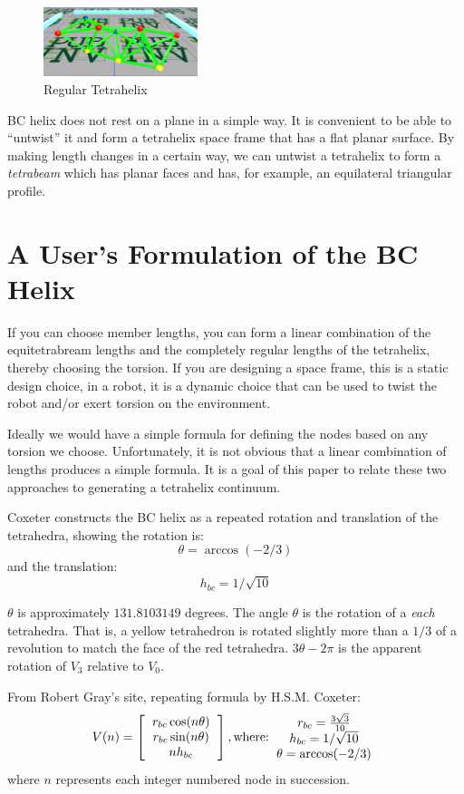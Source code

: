 \documentclass[11pt]{article}
\begin{document}
\begin{figure}[H] %
  \centering
     \includegraphics[width=0.4\textwidth]{figures/Tetrahelix0.png}
     \caption{Regular Tetrahelix}
\end{figure}

BC helix does not rest on a plane in a simple way. It is convenient to be able to ``untwist'' it and form a tetrahelix space frame that
has a flat planar surface. By making length changes in a certain way, we can untwist a tetrahelix to form a \emph{tetrabeam} which
has planar faces and has, for example, an equilateral triangular profile.

\section{A User's Formulation of the BC Helix}

If you can choose member lengths, you can form a linear combination of the equitetrabream lengths and the completely regular
lengths of the tetrahelix, thereby choosing the torsion.  If you are designing a space frame, this is a static design choice,
in a robot, it is a dynamic choice that can be used to twist the robot and/or exert torsion on the environment.

Ideally we would have a simple formula for defining the nodes based on any torsion we choose.
Unfortunately, it is not obvious that a linear combination of lengths produces a simple formula.
It is a goal of this paper to relate these two approaches to generating a tetrahelix continuum.

Coxeter constructs the BC helix\cite{coxeter1985simplicial} as a repeated rotation and translation of the tetrahedra, showing the
rotation is:
\[
\theta = \arccos(-2/3) 
\]
and the translation:
\[
h_{bc} = 1/\sqrt{10}
\]


$\theta$ is approximately $131.8103149$ degrees.
The angle $\theta$ is the rotation of a \emph{each} tetrahedra.
That is, a yellow tetrahedron is rotated slightly more than a $1/3$ of a revolution to match the face of the red tetrahedra.
$3 \theta - 2\pi$ is the apparent rotation of $V_3$ relative to $V_0$.

From Robert Gray's site, repeating formula by H.S.M. Coxeter:
\[
V(n) =
\left [
  \begin{tabular}{c}
   $ r_{bc} \cos(n \theta) $\\
   $ r_{bc} \sin(n \theta) $\\
   $ n h_{bc}  $
  \end{tabular}
  \right ],
\text{where:}
  \begin{tabular}{c}
 $ r_{bc} = \frac{3\sqrt{3}}{10} $\\
 $ h_{bc} = 1/\sqrt{10} $ \\
 $ \theta = \arccos(-2/3) $ \\
  \end{tabular}      
\]
where $n$ represents each integer numbered node in succession.
\end{document}
